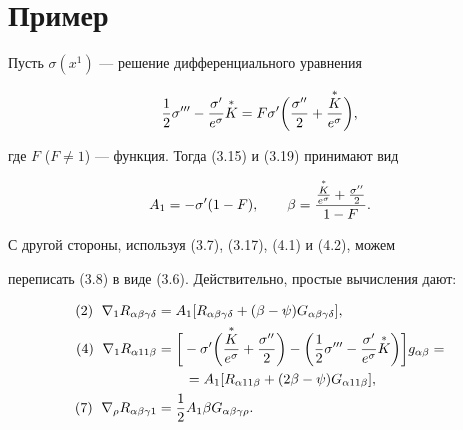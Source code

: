  


\section{Пример} 


 


Пусть $\sigma(x^1)$ --- решение дифференциального уравнения 


\begin{equation} 


\frac{1}{2}\sigma'''-\frac{\sigma'}{e^\sigma}\up{K}= 


F\sigma'\bigg(\frac{\sigma''}{2}+\frac{\up{K}}{e^\sigma}\bigg), 


\end{equation} 


где $F$ ($F\ne 1$) --- функция. Тогда (3.15) и (3.19) принимают вид 


\begin{equation} 


A_1=-\sigma'(1-F),\qquad 


\beta=\frac{\frac{\up{K}}{e^\sigma}+\frac{\sigma''}{2}} 


{1-F}. 


\end{equation} 


С другой стороны, используя (3.7), (3.17), (4.1) и (4.2), можем 


переписать (3.8) в виде (3.6). Действительно, простые вычисления дают: 


\begin{align*} 


(2)\ \; \nabla_1 R_{\alpha\beta\gamma\delta}&= 


A_1[R_{\alpha\beta\gamma\delta}+(\beta-\psi) 


G_{\alpha\beta\gamma\delta}],\\ 


(4)\ \; \nabla_1 R_{\alpha 11\beta}&=\bigg[-\sigma'\bigg( 


\frac{\up{K}}{e^\sigma}+\frac{\sigma''}{2}\bigg)-\bigg( 


\frac{1}{2}\sigma'''-\frac{\sigma'}{e^\sigma}\up{K} 


\bigg)\bigg]g_{\alpha\beta}= \\ 


&\qquad=A_1[R_{\alpha 11\beta}+(2\beta-\psi) 


G_{\alpha 11\beta}],\\ 


(7)\ \; \nabla_\rho R_{\alpha\beta\gamma 1}&= 


\frac{1}{2}A_1 \beta G_{\alpha\beta\gamma\rho}. 


\end{align*} 


